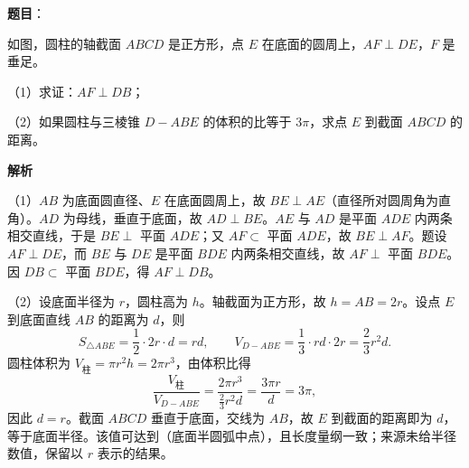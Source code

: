 \begin{answer}

\textbf{题目}：

如图，圆柱的轴截面 $ABCD$ 是正方形，点 $E$ 在底面的圆周上，$AF\perp DE$，$F$ 是垂足。
\nopagebreak[4]
\begin{center}\end{center}
\nopagebreak[4]
（1）求证：$AF\perp DB$；

（2）如果圆柱与三棱锥 $D-ABE$ 的体积的比等于 $3\pi$，求点 $E$ 到截面 $ABCD$ 的距离。

\textbf{解析}

（1）$AB$ 为底面圆直径、$E$ 在底面圆周上，故 $BE\perp AE$（直径所对圆周角为直角）。$AD$ 为母线，垂直于底面，故 $AD\perp BE$。$AE$ 与 $AD$ 是平面 $ADE$ 内两条相交直线，于是 $BE\perp$ 平面 $ADE$；又 $AF\subset$ 平面 $ADE$，故 $BE\perp AF$。题设 $AF\perp DE$，而 $BE$ 与 $DE$ 是平面 $BDE$ 内两条相交直线，故 $AF\perp$ 平面 $BDE$。因 $DB\subset$ 平面 $BDE$，得 $AF\perp DB$。

（2）设底面半径为 $r$，圆柱高为 $h$。轴截面为正方形，故 $h=AB=2r$。设点 $E$ 到底面直线 $AB$ 的距离为 $d$，则
\nopagebreak[4]
\[S_{\triangle ABE}=\frac12\cdot2r\cdot d=rd,\qquad V_{D-ABE}=\frac13\cdot rd\cdot2r=\frac23r^2d.\]
圆柱体积为 $V_{\mathrm{\text{柱}}}=\pi r^2h=2\pi r^3$，由体积比得
\nopagebreak[4]
\[\frac{V_{\mathrm{\text{柱}}}}{V_{D-ABE}}=\frac{2\pi r^3}{\frac23r^2d}=\frac{3\pi r}{d}=3\pi,\]
因此 $d=r$。截面 $ABCD$ 垂直于底面，交线为 $AB$，故 $E$ 到截面的距离即为 $d$，等于底面半径。该值可达到（底面半圆弧中点），且长度量纲一致；来源未给半径数值，保留以 $r$ 表示的结果。


\end{answer}
